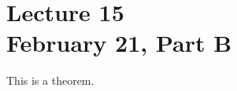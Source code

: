 \chapter*{Lecture 15 \\ February 21, Part B}
\setcounter{chapter}{15}
\setcounter{section}{0}

\begin{thm}
	This is a theorem.
\end{thm}
